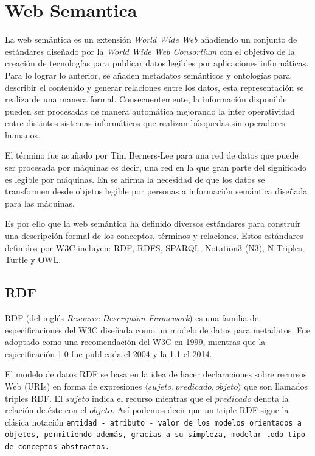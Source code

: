 \section{Web Semantica}

La web semántica es un extensión \emph{World Wide Web} añadiendo un conjunto de estándares  diseñado por la \emph{World Wide Web Consortium} con el objetivo de la creación de tecnologías para publicar datos legibles por aplicaciones informáticas. Para lo lograr lo anterior, se añaden metadatos semánticos y ontologías para describir el contenido y generar relaciones entre los datos, esta representación se realiza de una manera formal.
Consecuentemente, la información disponible pueden ser procesadas de manera automática mejorando la inter operatividad  entre distintos sistemas informáticos que realizan búsquedas sin operadores humanos.

El término fue acuñado por Tim Berners-Lee para una red de datos que puede ser procesada por máquinas es decir, una red en la que gran parte del significado es legible por máquinas. En \cite{berners1992world} se afirma la necesidad de que los datos se transformen desde objetos legible por personas a información semántica diseñada para las máquinas.

Es por ello que la web semántica ha definido diversos estándares para construir una descripción formal de los conceptos, términos y relaciones.  Estos estándares definidos por W3C incluyen: RDF, RDFS, SPARQL, Notation3 (N3), N-Triples, Turtle y OWL.


\subsection{RDF}\label{sw:rdf}
RDF (del inglés \emph{Resource Description Framework}) es una familia de
especificaciones del W3C diseñada como un modelo de datos para metadatos.
Fue adoptado como una recomendación del W3C en 1999, mientras que la
especificación 1.0 fue publicada el 2004 y la 1.1 el
2014\cite{bikakis2013semantic}.

El modelo de datos RDF se basa en la idea de hacer declaraciones sobre 
recursos Web (URIs) en forma de expresiones $\langle sujeto, predicado, objeto
\rangle$ que son llamados triples RDF.
El $sujeto$ indica el recurso mientras que el $predicado$ denota la relación de
éste con el $objeto$.
Así podemos decir que un triple RDF sigue la clásica notación \tt{entidad} - 
\tt{atributo} - \tt{valor} de los modelos orientados a objetos, permitiendo
además, gracias a su simpleza, modelar todo tipo de conceptos abstractos.


